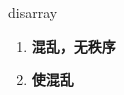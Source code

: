 
\begin{frame}
{\huge disarray}
\begin{center}
\begin{enumerate}\Large
  \item \textbf{混乱，无秩序}
  \item \textbf{使混乱}
\end{enumerate}
\end{center}
\end{frame}
